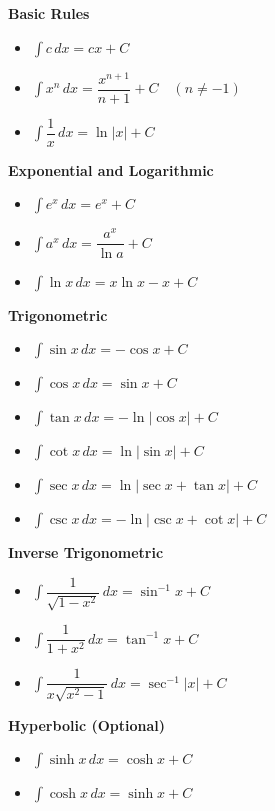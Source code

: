 \documentclass[12pt]{article}
\begin{document}
\begin{multicols}{2}

\textbf{Basic Rules}
\begin{itemize}
  \item $\int c\,dx = cx + C$
  \item $\int x^n\,dx = \dfrac{x^{n+1}}{n+1} + C \quad (n \neq -1)$
  \item $\int \dfrac{1}{x}\,dx = \ln|x| + C$
\end{itemize}

\textbf{Exponential and Logarithmic}
\begin{itemize}
  \item $\int e^x\,dx = e^x + C$
  \item $\int a^x\,dx = \dfrac{a^x}{\ln a} + C$
  \item $\int \ln x\,dx = x\ln x - x + C$
\end{itemize}

\textbf{Trigonometric}
\begin{itemize}
  \item $\int \sin x\,dx = -\cos x + C$
  \item $\int \cos x\,dx = \sin x + C$
  \item $\int \tan x\,dx = -\ln|\cos x| + C$
  \item $\int \cot x\,dx = \ln|\sin x| + C$
  \item $\int \sec x\,dx = \ln|\sec x + \tan x| + C$
  \item $\int \csc x\,dx = -\ln|\csc x + \cot x| + C$
\end{itemize}

\textbf{Inverse Trigonometric}
\begin{itemize}
  \item $\int \dfrac{1}{\sqrt{1 - x^2}}\,dx = \sin^{-1}x + C$
  \item $\int \dfrac{1}{1 + x^2}\,dx = \tan^{-1}x + C$
  \item $\int \dfrac{1}{x\sqrt{x^2 - 1}}\,dx = \sec^{-1}|x| + C$
\end{itemize}

\textbf{Hyperbolic (Optional)}
\begin{itemize}
  \item $\int \sinh x\,dx = \cosh x + C$
  \item $\int \cosh x\,dx = \sinh x + C$
\end{itemize}

\end{multicols}
\end{document}
